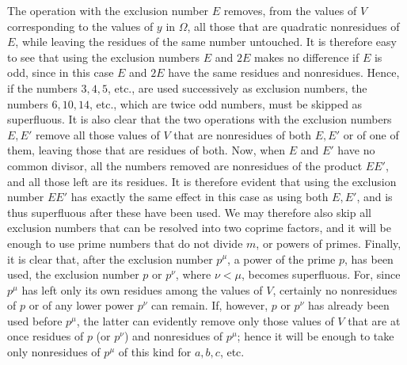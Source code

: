 The operation with the exclusion number \(E\) removes, from the values of \(V\) corresponding to the values of \(y\) in \(\Omega\), all those that are quadratic nonresidues of \(E\), while leaving the residues of the same number untouched. It is therefore easy to see that using the exclusion numbers \(E\) and \(2E\) makes no difference if \(E\) is odd, since in this case \(E\) and \(2E\) have the same residues and nonresidues. Hence, if the numbers \(3,\allowbreak 4,\allowbreak 5\), etc., are used successively as exclusion numbers, the numbers \(6,\allowbreak 10,\allowbreak 14\), etc., which are twice odd numbers, must be skipped as superfluous. It is also clear that the two operations with the exclusion numbers \(E,\allowbreak E'\) remove all those values of \(V\) that are nonresidues of both \(E,\allowbreak E'\) or of one of them, leaving those that are residues of both. Now, when \(E\) and \(E'\) have no common divisor, all the numbers removed are nonresidues of the product \(EE'\), and all those left are its residues. It is therefore evident that using the exclusion number \(EE'\) has exactly the same effect in this case as using both \(E,\allowbreak E'\), and is thus superfluous after these have been used. We may therefore also skip all exclusion numbers that can be resolved into two coprime factors, and it will be enough to use prime numbers that do not divide \(m\), or powers of primes. Finally, it is clear that, after the exclusion number \(p^\mu\), a power of the prime \(p\), has been used, the exclusion number \(p\) or \(p^\nu\), where \(\nu<\mu\), becomes superfluous. For, since \(p^\mu\) has left only its own residues among the values of \(V\), certainly no nonresidues of \(p\) or of any lower power \(p^\nu\) can remain. If, however, \(p\) or \(p^\nu\) has already been used before \(p^\mu\), the latter can evidently remove only those values of \(V\) that are at once residues of \(p\) (or \(p^\nu\)) and nonresidues of \(p^\mu\); hence it will be enough to take only nonresidues of \(p^\mu\) of this kind for \(a,\allowbreak b,\allowbreak c\), etc.

